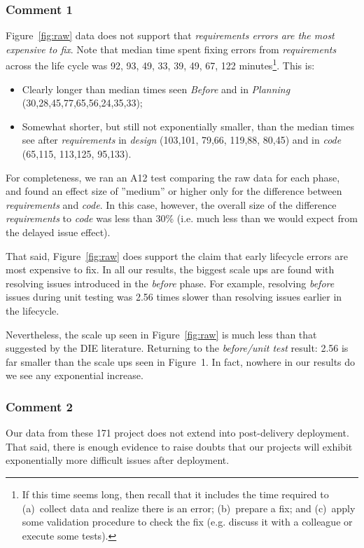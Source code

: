 \documentclass[smallcondesed]{svjour3}
\newcommand{\bi}{\begin{itemize}}%
\newcommand{\ei}{\end{itemize}}
\begin{document}
\subsubsection{Comment 1}
Figure~\ref{fig:raw}
 data does not support that   
{\em  requirements errors are the most expensive to fix}.
Note that   median time spent fixing errors from {\em requirements} across the life cycle was 92, 93,  49, 33, 39, 49, 67, 122 minutes\footnote{If this time seems long, then recall
that it includes the time required  to (a)~collect data and realize there is an error;
(b)~prepare a fix;  and (c)~apply some validation
procedure to check the fix (e.g. discuss it with a colleague or execute some tests).}.
This is:
\bi
\item
Clearly longer than median times seen {\em Before } and in {\em Planning}
(30,28,45,77,65,56,24,35,33);
\item
Somewhat shorter, but still not exponentially smaller,  than the median times see after {\em requirements} in {\em design}
(103,101, 79,66, 119,88, 80,45) and in {\em code} (65,115, 113,125, 95,133). 
\ei
For completeness, we ran an A12 test comparing the raw data for each phase, and found an effect size of ''medium'' or higher only for the difference between {\em requirements}
and {\em code}. In this case, however, 
 the overall size of the difference
{\em requirements} to {\em code} was less than 30\% (i.e. much less than we would
expect from the delayed issue effect). 

That said, Figure~\ref{fig:raw} does support the 
claim that early lifecycle errors are most expensive to fix.
In all our results, the biggest scale ups are found with resolving
issues introduced in the {\em before} phase. For example,
resolving {\em before} issues during unit testing was 2.56 times
slower than resolving issues earlier in the lifecycle. 

Nevertheless, the scale up seen in 
Figure~\ref{fig:raw} 
is much less
than that suggested by the DIE literature. Returning to
the {\em before/unit test} result: 2.56 is far smaller
than the scale ups seen in Figure~1. In fact, nowhere in 
our results do we see any exponential increase.

\newpage\subsubsection{Comment 2}
Our data from these 171 project does not extend into post-delivery deployment. That said,
there is enough evidence to raise doubts that our projects will exhibit exponentially more
difficult issues after deployment. 
\end{document}
